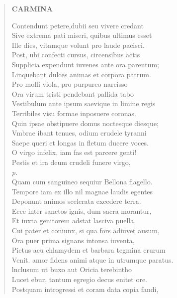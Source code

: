 \documentclass[11pt, a4paper]{report}
\begin{document}
\begin{verse}
    \begin{center} \textbf{CARMINA} \end{center} \marginpar{[42]} Contendunt petere,dubii seu vivere credant \\  \lbrack Sive extrema pati miseri, quibus ultimus esset \rbrack  \\ Ille dies, vitamque volunt pro laude pacisci. \\ Post, ubi confecti cursus, circensibus actis \\ Supplicia expendunt iuvenes ante ora parentum; \\ Linquebant dulces animas et corpora patrum. \\ Pro molli viola, pro purpureo narcisso \\ Ora virum tristi pendebant pallida tabo \\ Vestibulum ante ipsum saevique in limine regis \\ Terribiles visu formae inposuere coronas. \\ Quin ipsae obstipuere domus noctesque diesque; \\ Vmbrae ibant tenues, odium crudele tyranni \\ Saepe queri et longas in fletum ducere voces. \\ O virgo infelix, iam fas est parcere genti! \\ Pestis et ira deum crudeli funere virgo, \\ \textit{p.} \\ Quam cum sanguineo sequiur Bellona flagello. \\ Tempore iam ex illo nil magnae laudis egentes \\ Deponunt animos scelerata excedere terra. \\ Ecce inter sanctos ignis, dum sacra morantur, \\ Et iuxta genitorem adstat lasciva puella, \\ Cui pater et coniunx, si qua fors adiuvet ausum, \\ Ora puer prima signans intonsa iuventa, \\ Pictus acu chlamydem et barbara tegmina crurum \\ Venit. amor fidens animi  \lbrack atque \rbrack  in utrumque paratus. \\  \lbrack lnclusum ut buxo aut Oricia terebintho \rbrack  \\ Lucet ebur, tantum egregio decus enitet ore. \\ Postquam introgressi et coram data copia fandi, \\ 

\end{verse}
\end{document}
